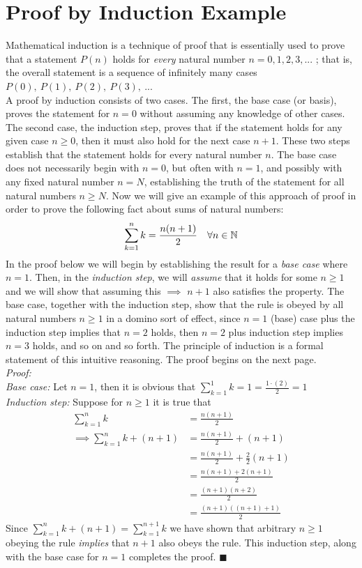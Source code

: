 \section{Proof by Induction Example}
\label{sec:InductionExample}
Mathematical induction is a technique of proof that is essentially used to prove that a statement $P(n)$ holds for \textit{every} natural number $n = 0, 1, 2, 3, ...$ ; that is, the overall statement is a sequence of infinitely many cases $P(0), \ P(1), \ P(2), \ P(3), \ ...$ \\
\noindent A proof by induction consists of two cases. The first, the base case (or basis), proves the statement for $n = 0$ without assuming any knowledge of other cases. The second case, the induction step, proves that if the statement holds for any given case $n\geq 0$, then it must also hold for the next case $n + 1$. These two steps establish that the statement holds for every natural number $n$. The base case does not necessarily begin with $n = 0$, but often with $n = 1$, and possibly with any fixed natural number $n = N$, establishing the truth of the statement for all natural numbers $n \geq N$. Now we will give an example of this approach of proof in order to prove the following fact about sums of natural numbers:
\begin{align}
    \sum_{k=1}^{n} k = \frac{n(n+1)}{2} \ \ \ \forall n \in {\mathbb{ N}} \nonumber
\end{align}
In the proof below we will begin by establishing the result for a \textit{base case} where $n=1$. Then, in the \textit{induction step}, we will \textit{assume} that it holds for some $n\geq 1$ and we will show that assuming this $\implies$ $n+1$ also satisfies the property. The base case, together with the induction step, show that the rule is obeyed by all natural numbers $n\geq 1$ in a domino sort of effect, since $n=1$ (base) case plus the induction step implies that $n=2$ holds, then $n=2$ plus induction step implies $n=3$ holds, and so on and so forth. The principle of induction is a formal statement of this intuitive reasoning. The proof begins on the next page.\\
\newpage 
\noindent \textit{Proof:}\\
\noindent\textit{Base case:} Let $n=1$, then it is obvious that $\sum_{k=1}^1 k = 1 = \frac{1\cdot(2)}{2}=1$\\
\textit{Induction step:} Suppose for $n\geq 1$ it is true that 
\begin{align}
    \sum_{k=1}^n k&=\frac{n(n+1)}{2}\nonumber\\ 
    \implies \sum_{k=1}^{n} k + (n+1)&=\frac{n(n+1)}{2} +(n+1)\nonumber\\ 
    &=\frac{n(n+1)}{2} +\frac{2}{2}(n+1)\nonumber\\
    &=\frac{n(n+1)+2(n+1)}{2} \nonumber \\
    &=\frac{(n+1)(n+2)}{2} \nonumber \\
    &=\frac{(n+1)((n+1)+1)}{2} \nonumber
\end{align}
Since $\sum_{k=1}^{n} k + (n+1)=\sum_{k=1}^{n+1} k$ we have shown that arbitrary $n\geq 1$ obeying the rule \textit{implies} that $n+1$ also obeys the rule. This induction step, along with the base case for $n=1$ completes the proof. $\blacksquare$
\smallbreak


